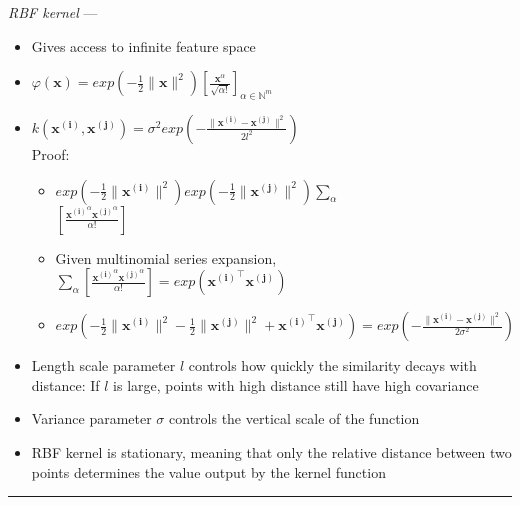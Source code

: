 \emph{RBF kernel} ---
\begin{itemize}
    \item Gives access to infinite feature space
    \item $\varphi(\boldsymbol{x}) = exp ( -\frac{1}{2} \|\boldsymbol{x}\|^2 ) [ \frac{ \boldsymbol{x}^\alpha }{ \sqrt{\alpha!} } ]_{\alpha \in \mathbb{N}^m}$ 
    \item $k( \boldsymbol{x^{(i)}}, \boldsymbol{x^{(j)}} ) = \sigma^2 exp (- \frac{ \| \boldsymbol{x^{(i)}} - \boldsymbol{x^{(j)}} \|^2 }{ 2l^2 } )$\\
    Proof:
    \begin{itemize}
        \item $exp ( -\frac{1}{2} \|\boldsymbol{x^{(i)}}\|^2 ) exp ( -\frac{1}{2} \|\boldsymbol{x^{(j)}}\|^2 ) \sum_\alpha$\\
        $[ \frac{ \boldsymbol{x^{(i)}}^\alpha \boldsymbol{x^{(j)}}^\alpha }{ \alpha! } ]$
        \item Given multinomial series expansion, $\sum_\alpha [ \frac{ \boldsymbol{x^{(i)}}^\alpha \boldsymbol{x^{(j)}}^\alpha }{ \alpha! } ] = exp(\boldsymbol{x^{(i)}}^\intercal \boldsymbol{x^{(j)}})$
        \item $exp ( -\frac{1}{2} \|\boldsymbol{x^{(i)}}\|^2  -\frac{1}{2} \|\boldsymbol{x^{(j)}}\|^2 + \boldsymbol{x^{(i)}}^\intercal \boldsymbol{x^{(j)}}) = exp (- \frac{ \| \boldsymbol{x^{(i)}} - \boldsymbol{x^{(j)}} \|^2 }{ 2\sigma^2 } )$
    \end{itemize}
    \item Length scale parameter $l$ controls how quickly the similarity decays with distance: If $l$ is large, points with high distance still have high covariance
    \item Variance parameter $\sigma$ controls the vertical scale of the function
    \item RBF kernel is stationary, meaning that only the relative distance between two points determines the value output by the kernel function
\end{itemize}

{\color{lightgray}\hrule height 0.001mm}

